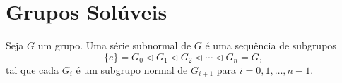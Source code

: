 \documentclass[11pt,openany]{book}
\begin{document}
\chapter{Grupos Solúveis}

\begin{definition}
\label{def:serie_subnormal}
    Seja \(G\) um grupo. Uma série subnormal de \(G\) é uma sequência de subgrupos
    \[
    \{e\} = G_0 \triangleleft G_1 \triangleleft G_2 \triangleleft \cdots \triangleleft G_n = G,
    \]
    tal que cada \(G_i\) é um subgrupo normal de \(G_{i+1}\) para \(i=0,1,\dots,n-1\).
\end{definition}



\end{document}
